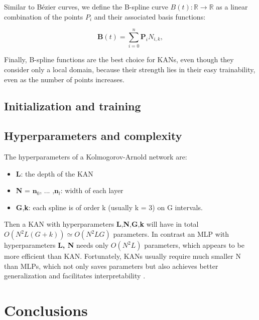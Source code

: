 \documentclass[12pt,a4paper]{article}
\begin{document}
Similar to Bézier curves, we define the B-spline curve \( B(t): \mathbb{R} \to \mathbb{R} \) as a linear combination of the points \( P_i \) and their associated basis functions:


\[
\mathbf{B}(t) = \sum_{i=0}^n \mathbf{P}_i N_{i,k},
\]

Finally, B-spline functions are the best choice for KANs, even though they consider only a local domain, because their strength lies in their easy trainability, even as the number of points increases.


\subsection{Initialization and training}

\subsection{Hyperparameters and complexity}
The hyperparameters of a Kolmogorov-Arnold network are:
\begin{itemize}
    \item \textbf{L}: the depth of the KAN
    \item \textbf{N} = $\textbf{n}_0$, ... ,$\textbf{n}_l$: width of each layer
    \item \textbf{G},\textbf{k}: each spline is of order k (usually k = 3) on G intervals.
\end{itemize}

Then a KAN with hyperparameters \textbf{L},\textbf{N},\textbf{G},\textbf{k} will have in total $O(N^2L(G + k))  \simeq O(N^2LG)$ parameters. In contrast an MLP with hyperparameters \textbf{L, N} needs only  $O(N^2L)$ parameters, which appears to be more efficient than KAN. Fortunately, KANs usually require much smaller N than MLPs, which not only saves parameters but also achieves better generalization and facilitates interpretability \cite{KAN}. 


\section{Conclusions}


\end{document}
